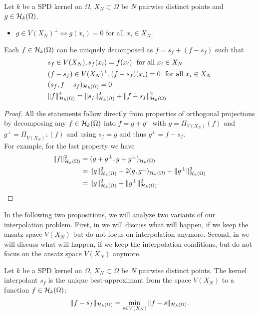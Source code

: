 \begin{coro}
\label{cor:projection_interpolant}
Let $k$ be a SPD kernel on $\Omega$, $X_N \subset \Omega$ be $N$ pairwise distinct points and $g \in \mathcal H_k (\Omega)$.
\begin{itemize}
\item $g \in V(X_N)^\perp \Leftrightarrow g(x_i) = 0$ for all $x_i \in X_N$.
\end{itemize}
Each $f \in \mathcal H_k (\Omega)$ can be uniquely decomposed as $f = s_f + (f-s_f)$ such that
\begin{align*}
&s_f \in V(X_N), s_f(x_i) = f(x_i) \text{~ for all\ } x_i \in X_N \\
&(f-s_f) \in V(X_N)^\perp, (f-s_f)(x_i) = 0 \text{~ for all\ } x_i \in X_N \\
&(s_f, f-s_f)_{\mathcal H_k (\Omega)} = 0 \\
&\Vert f \Vert_{\mathcal H_k (\Omega)}^2 = \Vert s_f \Vert_{\mathcal H_k (\Omega)}^2 + \Vert f - s_f \Vert_{\mathcal H_k (\Omega)}^2
\end{align*}
\end{coro}

\begin{proof}
All the statements follow directly from properties of orthogonal projections by decomposing any $f \in \mathcal H_k (\Omega)$ into $f = g + g^\perp$ with $g = \Pi_{V(X_N)}(f)$ and $g^\perp = \Pi_{V(X_N)^\perp}(f)$ and using $s_f = g$ and thus $g^\perp = f - s_f$. \\
For example, for the last property we have
\begin{align*}
\Vert f \Vert_{\mathcal H_k (\Omega)}^2 &= (g + g^\perp, g + g^\perp)_{\mathcal H_k (\Omega)} \\
&= \Vert g \Vert_{\mathcal H_k (\Omega)}^2 + 2(g, g^\perp)_{\mathcal H_k (\Omega)} + \Vert g^\perp \Vert_{\mathcal H_k (\Omega)}^2 \\
&= \Vert g \Vert_{\mathcal H_k (\Omega)}^2 + \Vert g^\perp \Vert_{\mathcal H_k (\Omega)}^2.
\end{align*} 
\end{proof}

In the following two propositions, we will analyze two variants of our interpolation problem.
First, in  we will discuss what will happen, if we keep the ansatz space $V(X_N)$ but do not focus on interpolation anymore.
Second, in  we will discuss what will happen, if we keep the interpolation conditions, but do not focus on the ansatz space $V(X_N)$ anymore.

\begin{prop}
\label{prop:best_approx_by_interpol}
Let $k$ be a SPD kernel on $\Omega$, $X_N \subset \Omega$ be $N$ pairwise distinct points.
The kernel interpolant $s_f$ is the unique best-approximant from the space $V(X_N)$ to a function $f \in \mathcal H_k (\Omega)$:
\begin{align*}
	\Vert f - s_f \Vert_{\mathcal H_k (\Omega)} = \min_{s \in V(X_N)} \Vert f - s \Vert_{\mathcal H_k (\Omega)}. 
\end{align*}
\end{prop}

